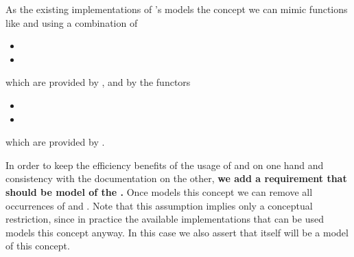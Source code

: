 \documentclass[a4paper,10pt]{article}
\begin{document}
\begin{itemize}
  As the existing implementations of \segtr's models the concept  we can mimic functions like  and  using a combination of
  \begin{itemize}
  \item {}
  \item {}
  \end{itemize}
  which are provided by , and by the functors
  \begin{itemize}
  \item {}
  \item {}
  \end{itemize}
  which are provided by .

  In order to keep the efficiency benefits of the usage of  and  on one hand and consistency with the documentation on the other, \textbf{{we add a requirement that \segtr should be model of the .}}
  Once \segtr models this concept we can remove all occurrences of  and .
  Note that this assumption implies only a conceptual restriction, since in practice the available implementations that can be used models this concept anyway.
  In this case we also assert that \polytr itself will be a model of this concept.


\end{itemize}
\end{document}
